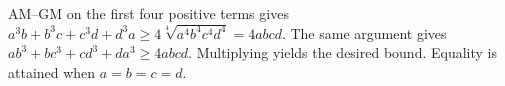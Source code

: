 AM--GM on the first four positive terms gives $a^3b+b^3c+c^3d+d^3a\ge4\sqrt[4]{a^4b^4c^4d^4}=4abcd$. The same argument gives $ab^3+bc^3+cd^3+da^3\ge4abcd$. Multiplying yields the desired bound. Equality is attained when $a=b=c=d$.
